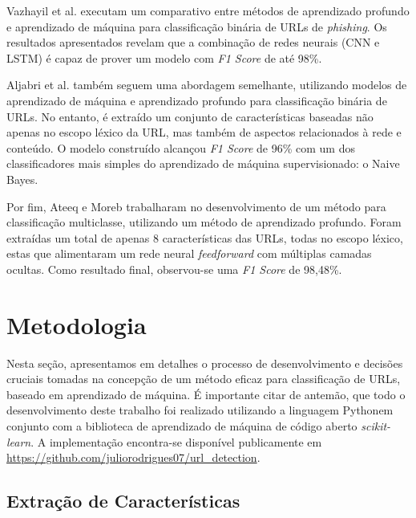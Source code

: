 \documentclass[manuscript,screen,review]{acmart}
\begin{document}
Vazhayil et al. \cite{8494159} executam um comparativo entre métodos de aprendizado profundo e aprendizado de máquina para classificação binária de URLs de \emph{phishing}. Os resultados apresentados revelam que a combinação de redes neurais (CNN e LSTM) é capaz de prover um modelo com \emph{F1 Score} de até 98\%.

Aljabri et al. \cite{10.1155/2022/3241216} também seguem uma abordagem semelhante, utilizando modelos de aprendizado de máquina e aprendizado profundo para classificação binária de URLs. No entanto, é extraído um conjunto de características baseadas não apenas no escopo léxico da URL, mas também de aspectos relacionados à rede e conteúdo. O modelo construído alcançou \emph{F1 Score} de 96\% com um dos classificadores mais simples do aprendizado de máquina supervisionado: o Naive Bayes.

Por fim, Ateeq e Moreb \cite{9493481} trabalharam no desenvolvimento de um método para classificação multiclasse, utilizando um método de aprendizado profundo. Foram extraídas um total de apenas 8 características das URLs, todas no escopo léxico, estas que alimentaram um rede neural \emph{feedforward} com múltiplas camadas ocultas. Como resultado final, observou-se uma \emph{F1 Score} de 98,48\%. 

\section{Metodologia} \label{sec:3}

Nesta seção, apresentamos em detalhes o processo de desenvolvimento e decisões cruciais tomadas na concepção de um método eficaz para classificação de URLs, baseado em aprendizado de máquina. É importante citar de antemão, que todo o desenvolvimento deste trabalho foi realizado utilizando a linguagem Python\footnotemark \hspace{0.1cm}em conjunto com a biblioteca de aprendizado de máquina de código aberto \emph{scikit-learn\footnotemark}. A implementação encontra-se disponível publicamente em \url{https://github.com/juliorodrigues07/url_detection}.


\subsection{Extração de Características}
\end{document}
